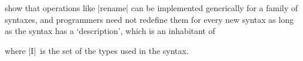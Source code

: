 \documentclass[sigplan,review,fleqn]{acmart}
\renewcommand{\verb}{\collectverb{\color{AgdaFunction}}}
\newcommand{\name}{\collectverb{\it}}
\begin{document}
\citeauthor{Allais-generic-syntax} show that operations like \verb|rename| can be implemented generically for a family of syntaxes, and programmers need not redefine them for every new syntax as long as the syntax has a `description', which is an inhabitant of
\begin{code}
	\>[0]\AgdaSpace{}%
	\AgdaSpace{}%
	\AgdaSymbol{(}\AgdaSpace{}%
	\AgdaSymbol{:}\AgdaSpace{}%
	\AgdaSymbol{)}\AgdaSpace{}%
	\AgdaSymbol{:}\AgdaSpace{}%
	\<%
\end{code}
where \name|I|\/~is the set of the types used in the syntax.
\end{document}
